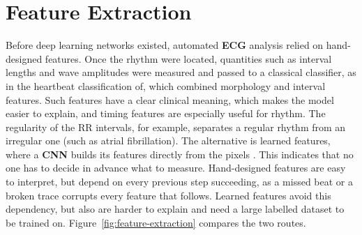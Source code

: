 \section{Feature Extraction}
\label{sec:features}

Before deep learning networks existed, automated \textbf{ECG} analysis relied on hand-designed features. Once the
rhythm were located, quantities such as interval lengths and wave amplitudes were measured and passed to a classical classifier, as in the heartbeat classification of\textcite{de_chazal_automatic_2004}, which combined morphology and interval features.
Such features have a clear clinical meaning, which makes the model easier to explain, and
timing features are especially useful for rhythm. The regularity of the RR intervals, for
example, separates a regular rhythm from an irregular one (such as atrial fibrillation). The
alternative is learned features, where a \textbf{CNN} builds its features directly from the pixels
\cite{lecun_deep_2015}. This indicates that no one has to decide in advance what to measure.
Hand-designed features are easy to interpret, but depend on every previous step succeeding, as a missed beat or a broken trace corrupts every feature that follows. Learned
features avoid this dependency, but also are harder to explain and need a large labelled
dataset to be trained on. Figure~\ref{fig:feature-extraction} compares the two routes.

